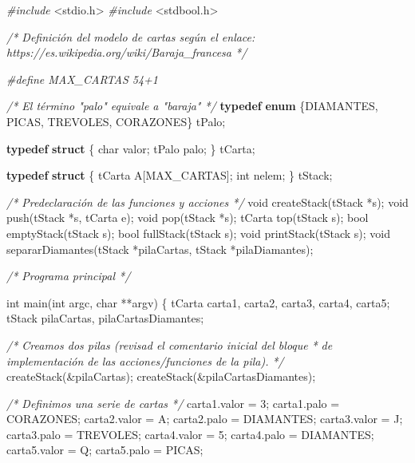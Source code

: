 \documentclass[
]{book}
\newenvironment{Shaded}{\begin{snugshade}}{\end{snugshade}}
\newcommand{\CharTok}[1]{\textcolor[rgb]{0.31,0.60,0.02}{#1}}
\newcommand{\CommentTok}[1]{\textcolor[rgb]{0.56,0.35,0.01}{\textit{#1}}}
\newcommand{\DataTypeTok}[1]{\textcolor[rgb]{0.13,0.29,0.53}{#1}}
\newcommand{\ImportTok}[1]{#1}
\newcommand{\KeywordTok}[1]{\textcolor[rgb]{0.13,0.29,0.53}{\textbf{#1}}}
\newcommand{\NormalTok}[1]{#1}
\newcommand{\PreprocessorTok}[1]{\textcolor[rgb]{0.56,0.35,0.01}{\textit{#1}}}
\begin{document}
\begin{Shaded}
\begin{Highlighting}[]
\PreprocessorTok{\#include }\ImportTok{\textless{}stdio.h\textgreater{}}
\PreprocessorTok{\#include }\ImportTok{\textless{}stdbool.h\textgreater{}}

\CommentTok{/* Definición del modelo de cartas según el enlace:}
\CommentTok{   https://es.wikipedia.org/wiki/Baraja\_francesa */}

\PreprocessorTok{\#define MAX\_CARTAS 54+1}

\CommentTok{/* El término "palo" equivale a "baraja" */}
\KeywordTok{typedef} \KeywordTok{enum}\NormalTok{ \{DIAMANTES, PICAS, TREVOLES, CORAZONES\} tPalo;}

\KeywordTok{typedef} \KeywordTok{struct}\NormalTok{ \{}
    \DataTypeTok{char}\NormalTok{ valor;}
\NormalTok{    tPalo palo;}
\NormalTok{\} tCarta;}

\KeywordTok{typedef} \KeywordTok{struct}\NormalTok{ \{}
\NormalTok{    tCarta A[MAX\_CARTAS];}
    \DataTypeTok{int}\NormalTok{ nelem;}
\NormalTok{\} tStack;}

\CommentTok{/* Predeclaración de las funciones y acciones */}
\DataTypeTok{void}\NormalTok{ createStack(tStack *s);}
\DataTypeTok{void}\NormalTok{ push(tStack *s, tCarta e);}
\DataTypeTok{void}\NormalTok{ pop(tStack *s);}
\NormalTok{tCarta top(tStack s);}
\DataTypeTok{bool}\NormalTok{ emptyStack(tStack s);}
\DataTypeTok{bool}\NormalTok{ fullStack(tStack s);}
\DataTypeTok{void}\NormalTok{ printStack(tStack s);}
\DataTypeTok{void}\NormalTok{ separarDiamantes(tStack *pilaCartas, tStack *pilaDiamantes);}

\CommentTok{/* Programa principal */}

\DataTypeTok{int}\NormalTok{ main(}\DataTypeTok{int}\NormalTok{ argc, }\DataTypeTok{char}\NormalTok{ **argv) \{}
\NormalTok{    tCarta carta1, carta2, carta3, carta4, carta5;}
\NormalTok{    tStack pilaCartas, pilaCartasDiamantes;}
    
    \CommentTok{/* Creamos dos pilas (revisad el comentario inicial del bloque}
\CommentTok{     * de implementación de las acciones/funciones de la pila).}
\CommentTok{     */}
\NormalTok{    createStack(\&pilaCartas);}
\NormalTok{    createStack(\&pilaCartasDiamantes);}
    
    \CommentTok{/* Definimos una serie de cartas */}
\NormalTok{    carta1.valor = }\CharTok{\textquotesingle{}3\textquotesingle{}}\NormalTok{;}
\NormalTok{    carta1.palo = CORAZONES;}
\NormalTok{    carta2.valor = }\CharTok{\textquotesingle{}A\textquotesingle{}}\NormalTok{;}
\NormalTok{    carta2.palo = DIAMANTES;}
\NormalTok{    carta3.valor = }\CharTok{\textquotesingle{}J\textquotesingle{}}\NormalTok{;}
\NormalTok{    carta3.palo = TREVOLES;}
\NormalTok{    carta4.valor = }\CharTok{\textquotesingle{}5\textquotesingle{}}\NormalTok{;}
\NormalTok{    carta4.palo = DIAMANTES;}
\NormalTok{    carta5.valor = }\CharTok{\textquotesingle{}Q\textquotesingle{}}\NormalTok{;}
\NormalTok{    carta5.palo = PICAS;}
    

\end{Highlighting}
\end{Shaded}
\end{document}
